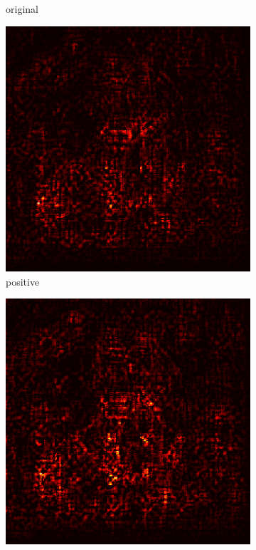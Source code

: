 \documentclass[preprint,12pt]{elsarticle}
\begin{document}
\begin{figure}
\begin{subfigure}{0.14\linewidth}
        \caption{original}
    \end{subfigure}
    \hfill
    \begin{subfigure}{0.14\textwidth}
        \centering
        \includegraphics[width=\linewidth]{../visualizations/examples/imagenette/resnet18/positive_saliency_map/0.png}
        \caption{positive}
    \end{subfigure}
    \hfill
    \begin{subfigure}{0.14\textwidth}
        \centering
        \includegraphics[width=\linewidth]{../visualizations/examples/imagenette/resnet18/negative_saliency_map/0.png}

\end{subfigure}
\end{figure}
\end{document}
